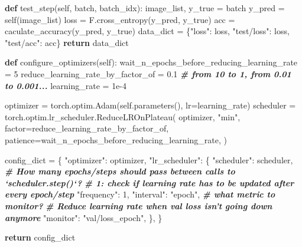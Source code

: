 \documentclass[]{article}
\newenvironment{Shaded}{\begin{snugshade}}{\end{snugshade}}
\newcommand{\CommentTok}[1]{\textcolor[rgb]{0.00,0.40,1.00}{\textbf{\textit{#1}}}}
\newcommand{\ControlFlowTok}[1]{\textcolor[rgb]{0.26,0.66,0.93}{\textbf{#1}}}
\newcommand{\DecValTok}[1]{\textcolor[rgb]{0.27,0.67,0.26}{#1}}
\newcommand{\FloatTok}[1]{\textcolor[rgb]{0.27,0.67,0.26}{#1}}
\newcommand{\KeywordTok}[1]{\textcolor[rgb]{0.26,0.66,0.93}{\textbf{#1}}}
\newcommand{\NormalTok}[1]{\textcolor[rgb]{0.74,0.68,0.62}{#1}}
\newcommand{\OperatorTok}[1]{\textcolor[rgb]{0.74,0.68,0.62}{#1}}
\newcommand{\StringTok}[1]{\textcolor[rgb]{0.02,0.61,0.04}{#1}}
\newcommand{\VariableTok}[1]{\textcolor[rgb]{0.74,0.68,0.62}{#1}}
\begin{document}
\begin{Shaded}
\begin{Highlighting}[]
    \KeywordTok{def}\NormalTok{ test_step(}\VariableTok{self}\NormalTok{, batch, batch_idx):}
\NormalTok{        image_list, y_true }\OperatorTok{=}\NormalTok{ batch}
\NormalTok{        y_pred }\OperatorTok{=} \VariableTok{self}\NormalTok{(image_list)}
\NormalTok{        loss }\OperatorTok{=}\NormalTok{ F.cross_entropy(y_pred, y_true)}
\NormalTok{        acc }\OperatorTok{=}\NormalTok{ caculate_accuracy(y_pred, y_true)}
\NormalTok{        data_dict }\OperatorTok{=}\NormalTok{ \{}\StringTok{"loss"}\NormalTok{: loss, }\StringTok{"test/loss"}\NormalTok{: loss, }\StringTok{"test/acc"}\NormalTok{: acc\}}
        \ControlFlowTok{return}\NormalTok{ data_dict}

    \KeywordTok{def}\NormalTok{ configure_optimizers(}\VariableTok{self}\NormalTok{):}
\NormalTok{        wait_n_epochs_before_reducing_learning_rate }\OperatorTok{=} \DecValTok{5}
\NormalTok{        reduce_learning_rate_by_factor_of }\OperatorTok{=} \FloatTok{0.1}  \CommentTok{# from 10 to 1, from 0.01 to 0.001...}
\NormalTok{        learning_rate }\OperatorTok{=} \FloatTok{1e-4}

\NormalTok{        optimizer }\OperatorTok{=}\NormalTok{ torch.optim.Adam(}\VariableTok{self}\NormalTok{.parameters(), lr}\OperatorTok{=}\NormalTok{learning_rate)}
\NormalTok{        scheduler }\OperatorTok{=}\NormalTok{ torch.optim.lr_scheduler.ReduceLROnPlateau(}
\NormalTok{            optimizer,}
            \StringTok{"min"}\NormalTok{,}
\NormalTok{            factor}\OperatorTok{=}\NormalTok{reduce_learning_rate_by_factor_of,}
\NormalTok{            patience}\OperatorTok{=}\NormalTok{wait_n_epochs_before_reducing_learning_rate,}
\NormalTok{        )}

\NormalTok{        config_dict }\OperatorTok{=}\NormalTok{ \{}
            \StringTok{"optimizer"}\NormalTok{: optimizer,}
            \StringTok{"lr_scheduler"}\NormalTok{: \{}
                \StringTok{"scheduler"}\NormalTok{: scheduler,}
                \CommentTok{# How many epochs/steps should pass between calls to `scheduler.step()`?}
                \CommentTok{# 1: check if learning rate has to be updated after every epoch/step}
                \StringTok{"frequency"}\NormalTok{: }\DecValTok{1}\NormalTok{,}
                \StringTok{"interval"}\NormalTok{: }\StringTok{"epoch"}\NormalTok{,}
                \CommentTok{# what metric to monitor?}
                \CommentTok{# Reduce learning rate when val loss isn't going down anymore}
                \StringTok{"monitor"}\NormalTok{: }\StringTok{"val/loss_epoch"}\NormalTok{,}
\NormalTok{            \},}
\NormalTok{        \}}

        \ControlFlowTok{return}\NormalTok{ config_dict}
\end{Highlighting}
\end{Shaded}
\end{document}
